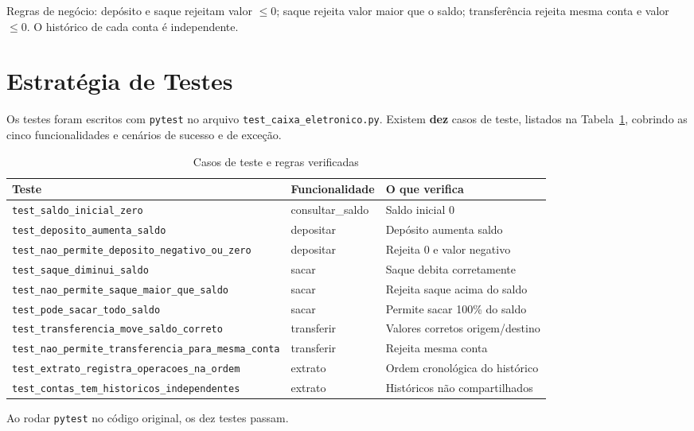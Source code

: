 \documentclass[11pt,a4paper]{article}
\begin{document}
Regras de negócio: depósito e saque rejeitam valor $\leq 0$; saque rejeita valor maior que o saldo; transferência rejeita mesma conta e valor $\leq 0$. O histórico de cada conta é independente.

\section{Estratégia de Testes}

Os testes foram escritos com \texttt{pytest} no arquivo \texttt{test\_caixa\_eletronico.py}. Existem \textbf{dez} casos de teste, listados na Tabela~\ref{tab:testes}, cobrindo as cinco funcionalidades e cenários de sucesso e de exceção.

\begin{table}[H]
  \centering
  \caption{Casos de teste e regras verificadas}
  \label{tab:testes}
  \begin{tabular}{lll}
    \toprule
    Teste & Funcionalidade & O que verifica \\
    \midrule
    \texttt{test\_saldo\_inicial\_zero} & consultar\_saldo & Saldo inicial 0 \\
    \texttt{test\_deposito\_aumenta\_saldo} & depositar & Depósito aumenta saldo \\
    \texttt{test\_nao\_permite\_deposito\_negativo\_ou\_zero} & depositar & Rejeita 0 e valor negativo \\
    \texttt{test\_saque\_diminui\_saldo} & sacar & Saque debita corretamente \\
    \texttt{test\_nao\_permite\_saque\_maior\_que\_saldo} & sacar & Rejeita saque acima do saldo \\
    \texttt{test\_pode\_sacar\_todo\_saldo} & sacar & Permite sacar 100\% do saldo \\
    \texttt{test\_transferencia\_move\_saldo\_correto} & transferir & Valores corretos origem/destino \\
    \texttt{test\_nao\_permite\_transferencia\_para\_mesma\_conta} & transferir & Rejeita mesma conta \\
    \texttt{test\_extrato\_registra\_operacoes\_na\_ordem} & extrato & Ordem cronológica do histórico \\
    \texttt{test\_contas\_tem\_historicos\_independentes} & extrato & Históricos não compartilhados \\
    \bottomrule
  \end{tabular}
\end{table}

Ao rodar \texttt{pytest} no código original, os dez testes passam.
\end{document}
